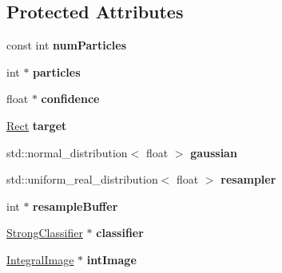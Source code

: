 \subsection*{Protected Attributes}
\begin{DoxyCompactItemize}
\item 
\hypertarget{classParticleFilter_a76cca3c44c00837d85751bb913280361}{}const int {\bfseries num\+Particles}\label{classParticleFilter_a76cca3c44c00837d85751bb913280361}

\item 
\hypertarget{classParticleFilter_a0175a0c46621095d013e8fc539b94eed}{}int $\ast$ {\bfseries particles}\label{classParticleFilter_a0175a0c46621095d013e8fc539b94eed}

\item 
\hypertarget{classParticleFilter_a68e04e60c13a06afc10bcce6b4d056b6}{}float $\ast$ {\bfseries confidence}\label{classParticleFilter_a68e04e60c13a06afc10bcce6b4d056b6}

\item 
\hypertarget{classParticleFilter_aa97f15d13d905348953cdc3122871255}{}\hyperlink{classRect}{Rect} {\bfseries target}\label{classParticleFilter_aa97f15d13d905348953cdc3122871255}

\item 
\hypertarget{classParticleFilter_a861497b4329e28e078d7ebfa381baae9}{}std\+::normal\+\_\+distribution$<$ float $>$ {\bfseries gaussian}\label{classParticleFilter_a861497b4329e28e078d7ebfa381baae9}

\item 
\hypertarget{classParticleFilter_aa6149560d37c102c0e96b2b0cd9b696b}{}std\+::uniform\+\_\+real\+\_\+distribution$<$ float $>$ {\bfseries resampler}\label{classParticleFilter_aa6149560d37c102c0e96b2b0cd9b696b}

\item 
\hypertarget{classParticleFilter_a23a3c5e7016d74cf775031b612c19839}{}int $\ast$ {\bfseries resample\+Buffer}\label{classParticleFilter_a23a3c5e7016d74cf775031b612c19839}

\item 
\hypertarget{classParticleFilter_a401acf4c7135f33a419a7291594d8f22}{}\hyperlink{classStrongClassifier}{Strong\+Classifier} $\ast$ {\bfseries classifier}\label{classParticleFilter_a401acf4c7135f33a419a7291594d8f22}

\item 
\hypertarget{classParticleFilter_a41408c9a167ae09cf8b77f4df483a5c4}{}\hyperlink{classIntegralImage}{Integral\+Image} $\ast$ {\bfseries int\+Image}\label{classParticleFilter_a41408c9a167ae09cf8b77f4df483a5c4}

\end{DoxyCompactItemize}
